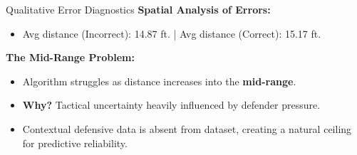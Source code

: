 \begin{frame}{Qualitative Error Diagnostics}
    \textbf{Spatial Analysis of Errors:}
    \begin{itemize}
        \item Avg distance (Incorrect): 14.87 ft. | Avg distance (Correct): 15.17 ft.
    \end{itemize}
    \vspace{0.3cm}
    \textbf{The Mid-Range Problem:}
    \begin{itemize}
        \item Algorithm struggles as distance increases into the \textbf{mid-range}.
        \item \textbf{Why?} Tactical uncertainty heavily influenced by defender pressure.
        \item Contextual defensive data is absent from dataset, creating a natural ceiling for predictive reliability.
    \end{itemize}
\end{frame}